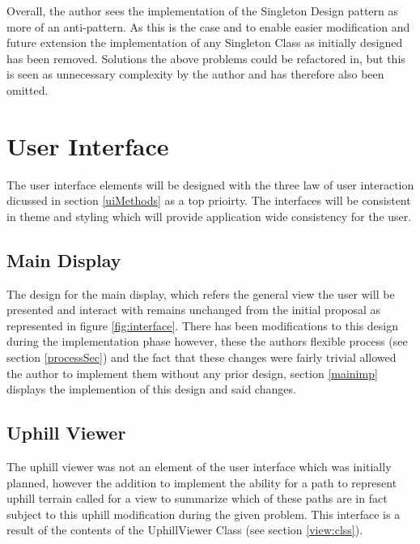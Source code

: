 Overall, the author sees the implementation of the Singleton Design pattern as more of an anti-pattern. As this is the case and to enable easier modification and future extension the implementation of any Singleton Class as initially designed has been removed. Solutions the above problems could be refactored in, but this is seen as unnecessary complexity by the author and has therefore also been omitted.

\section{User Interface}

The user interface elements will be designed with the three law of user interaction dicussed in section \ref{uiMethods} as a top prioirty. The interfaces will be consistent in theme and styling which will provide application wide consistency for the user.

\subsection{Main Display}

The design for the main display, which refers the general view the user will be presented and interact with remains unchanged from the initial proposal as represented in figure \ref{fig:interface}. There has been modifications to this design during the implementation phase however, these the authors flexible process (see section \ref{processSec}) and the fact that these changes were fairly trivial allowed the author to implement them without any prior design, section \ref{mainimp} displays the implemention of this design and said changes.

\subsection{Uphill Viewer}
\label{uphillview}

The uphill viewer was not an element of the user interface which was initially planned, however the addition to implement the ability for a path to represent uphill terrain called for a view to summarize which of these paths are in fact subject to this uphill modification during the given problem. This interface is a result of the contents of the UphillViewer Class (see section \ref{view:clss}).


